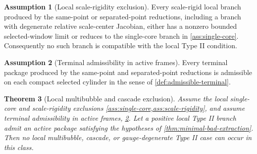 \documentclass[11pt]{amsart}
\theoremstyle{plain}
\newtheorem{theorem}{Theorem}[section]
\theoremstyle{definition}
\newtheorem{assumption}[theorem]{Assumption}
\theoremstyle{remark}
\begin{document}
\begin{assumption}[Local scale-rigidity exclusion]\label{ass:scale-rigidity}
Every scale-rigid local branch produced by the same-point or separated-point
reductions, including a branch with degenerate relative scale-center Jacobian,
either has a nonzero bounded selected-window limit or reduces to the single-core
branch in \cref{ass:single-core}.  Consequently no such branch is compatible
with the local Type II condition.
\end{assumption}

\begin{assumption}[Terminal admissibility in active frames]\label{ass:terminal-admissibility}
Every terminal package produced by the same-point and separated-point reductions
is admissible on each compact selected cylinder in the sense of
\cref{def:admissible-terminal}.
\end{assumption}

\begin{theorem}[Local multibubble and cascade exclusion]\label{thm:multi}
Assume the local single-core and scale-rigidity exclusions
\cref{ass:single-core,ass:scale-rigidity}, and assume terminal admissibility in
active frames, \cref{ass:terminal-admissibility}.  Let a positive local Type II
branch admit an active package satisfying the hypotheses of
\cref{thm:minimal-bad-extraction}.  Then no local multibubble, cascade, or
gauge-degenerate Type II case can occur in this class.
\end{theorem}
\end{document}
